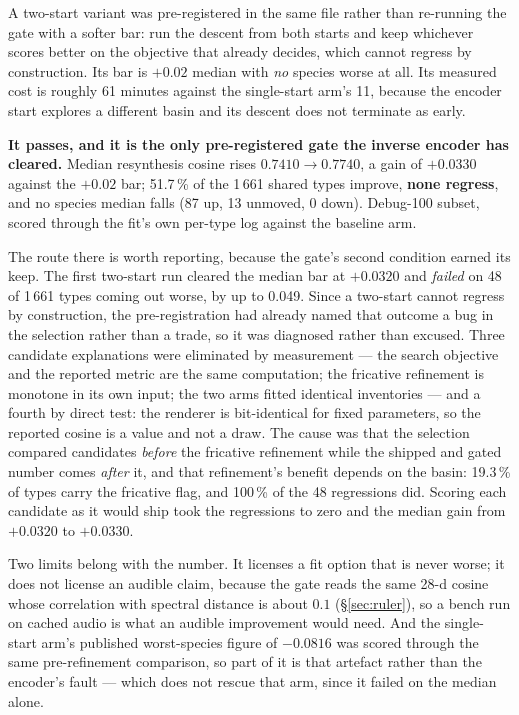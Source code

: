 \documentclass[10pt,twocolumn,a4paper]{article}
\begin{document}
A two-start variant was pre-registered in the same file rather than re-running the gate with
a softer bar: run the descent from both starts and keep whichever scores better on the
objective that already decides, which cannot regress by construction. Its bar is $+0.02$
median with \emph{no} species worse at all. Its measured cost is roughly 61 minutes against
the single-start arm's 11, because the encoder start explores a different basin and its
descent does not terminate as early.

\textbf{It passes, and it is the only pre-registered gate the inverse encoder has cleared.}
Median resynthesis cosine rises $0.7410 \rightarrow 0.7740$, a gain of $+0.0330$ against the
$+0.02$ bar; 51.7\,\% of the 1\,661 shared types improve, \textbf{none regress}, and no
species median falls (87 up, 13 unmoved, 0 down). Debug-100 subset, scored through the fit's
own per-type log against the baseline arm.

The route there is worth reporting, because the gate's second condition earned its keep. The
first two-start run cleared the median bar at $+0.0320$ and \emph{failed} on 48 of 1\,661
types coming out worse, by up to 0.049. Since a two-start cannot regress by construction, the
pre-registration had already named that outcome a bug in the selection rather than a trade,
so it was diagnosed rather than excused. Three candidate explanations were eliminated by
measurement --- the search objective and the reported metric are the same computation; the
fricative refinement is monotone in its own input; the two arms fitted identical inventories
--- and a fourth by direct test: the renderer is bit-identical for fixed parameters, so the
reported cosine is a value and not a draw. The cause was that the selection compared
candidates \emph{before} the fricative refinement while the shipped and gated number comes
\emph{after} it, and that refinement's benefit depends on the basin: 19.3\,\% of types carry
the fricative flag, and 100\,\% of the 48 regressions did. Scoring each candidate as it would
ship took the regressions to zero and the median gain from $+0.0320$ to $+0.0330$.

Two limits belong with the number. It licenses a fit option that is never worse; it does not
license an audible claim, because the gate reads the same 28-d cosine whose correlation with
spectral distance is about $0.1$ (\S\ref{sec:ruler}), so a bench run on cached audio is what
an audible improvement would need. And the single-start arm's published worst-species figure
of $-0.0816$ was scored through the same pre-refinement comparison, so part of it is that
artefact rather than the encoder's fault --- which does not rescue that arm, since it failed
on the median alone.
\end{document}
